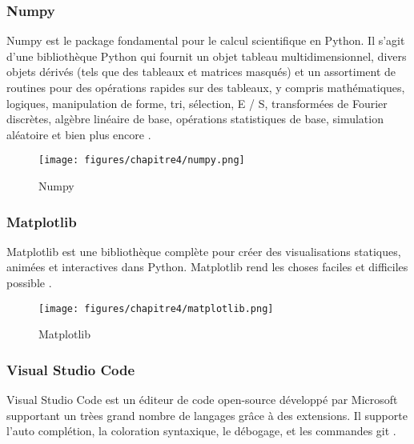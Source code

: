         \subsubsection{Numpy}
        \par Numpy est le package fondamental pour le calcul scientifique en Python. Il s’agit d’une bibliothèque Python qui fournit un objet tableau multidimensionnel, divers objets dérivés (tels que des tableaux et matrices masqués) et un assortiment de routines pour des opérations rapides sur des tableaux, y compris mathématiques, logiques, manipulation de forme, tri, sélection, E / S, transformées de Fourier discrètes, algèbre linéaire de base, opérations statistiques de base, simulation aléatoire et bien plus encore \cite{numpy}.
        
        \begin{figure}[H]
        	\begin{center}
        		\texttt{[image: figures/chapitre4/numpy.png]}
        	\end{center}
        	\caption {Numpy}
        	\label{fig:numpy}
        \end{figure} 
        
        \subsubsection{Matplotlib}
        \par Matplotlib est une bibliothèque complète pour créer des visualisations statiques, animées et interactives dans Python. Matplotlib rend les choses faciles et difficiles possible \cite{matplotlib}.

        \begin{figure}[H]
        	\begin{center}
        		\texttt{[image: figures/chapitre4/matplotlib.png]}
        	\end{center}
        	\caption {Matplotlib}
        	\label{fig:matplotlib}
        \end{figure}  
        
        \subsubsection{Visual Studio Code}
        \par Visual Studio Code est un éditeur de code open-source développé par Microsoft supportant un trèes grand nombre de langages grâce à des extensions. Il supporte l’auto complétion, la coloration syntaxique, le débogage, et les commandes git \cite{vscode}.
        
